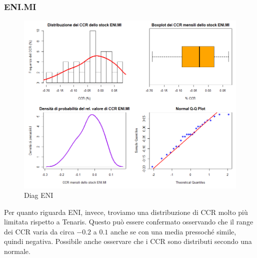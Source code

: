 \documentclass[12pt]{article}
\begin{document}
\subsubsection{ENI.MI}
\begin{figure}[!htb]
    \centering
    \includegraphics[width=1\textwidth]{immagini/diag_eni.png}
    \caption{Diag ENI}
\end{figure}
\FloatBarrier
Per quanto riguarda ENI, invece, troviamo una distribuzione di CCR molto più limitata rispetto a Tenaris. Questo può essere confermato osservando che il range dei CCR varia da circa $-0.2$ a $0.1$ anche se con una media pressoché simile, quindi negativa. Possibile anche osservare che i CCR sono distributi secondo una normale.
\newpage
\end{document}

